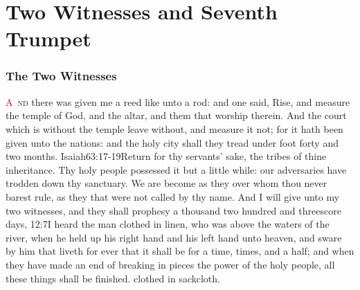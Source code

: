 
\chapter{Two Witnesses and Seventh Trumpet}
\subsection*{The Two Witnesses}
\lettrine[lines=3,slope=0.5em]{\textcolor{red}{A}}{\ nd} there was given me a reed like unto a rod:%
 and one said, Rise, and measure the temple of God, and the altar, and them that worship therein. 
And the court which is without the temple leave without, and measure it not; for it hath been given unto the nations: and the holy city shall they tread under foot forty and two months.%
					{Isaiah}{63:17-19}{Return for thy servants’ sake, the tribes of thine inheritance. Thy holy people possessed it but a little while: our adversaries have trodden down thy sanctuary. We are become as they over whom thou never barest rule, as they that were not called by thy name.} %
And I will give unto my two witnesses, and they shall prophesy a thousand two hundred and threescore days,%
					{12:7}{I heard the man clothed in linen, who was above the waters of the river, when he held up his right hand and his left hand unto heaven, and sware by him that liveth for ever that it shall be for a time, times, and a half; and when they have made an end of breaking in pieces the power of the holy people, all these things shall be finished.}
 clothed in sackcloth. 
